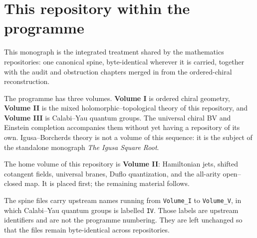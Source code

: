 \chapter*{This repository within the programme}

This monograph is the integrated treatment shared by the mathematics
repositories: one canonical spine, byte-identical wherever it is carried,
together with the audit and obstruction chapters merged in from the
ordered-chiral reconstruction.

The programme has three volumes. \textbf{Volume I} is ordered chiral
geometry, \textbf{Volume II} is the mixed holomorphic--topological theory
of this repository, and \textbf{Volume III} is Calabi--Yau quantum groups.
The universal chiral BV and Einstein completion accompanies them without
yet having a repository of its own. Igusa--Borcherds theory is not a
volume of this sequence: it is the subject of the standalone monograph
\emph{The Igusa Square Root}.

The home volume of this repository is \textbf{Volume II}: Hamiltonian
jets, shifted cotangent fields, universal branes, Duflo quantization, and
the all-arity open--closed map. It is placed first; the remaining material
follows.

The spine files carry upstream names running from \texttt{Volume\_I} to
\texttt{Volume\_V}, in which Calabi--Yau quantum groups is labelled
\texttt{IV}. Those labels are upstream identifiers and are not the
programme numbering. They are left unchanged so that the files remain
byte-identical across repositories.

